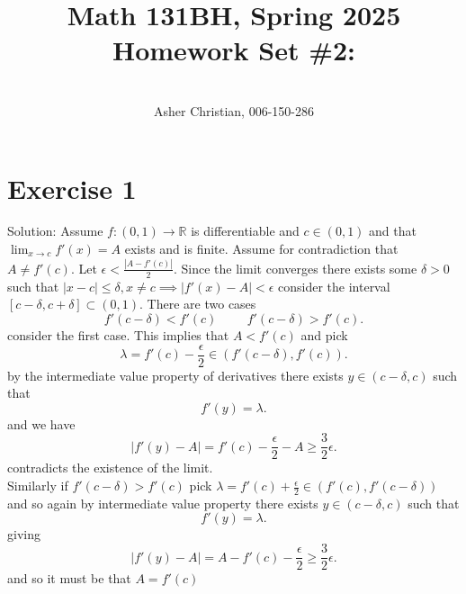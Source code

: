 \documentclass[11pt]{article}
\newcommand{\cnum}{Math 131BH}
\newcommand{\ced}{Spring 2025}
\newcommand{\ctitle}[4]{\title{\vspace{-0.5in}\cnum, \ced\\Homework Set #1: #2}\author{\vspace{-0.35in}\\#3, #4}}
\newcommand{\solution}[1]{{{\textcolor{header}{Solution:} \textcolor{solution}{#1}}}}
\begin{document}
\ctitle{\#2}{}{Asher Christian}{006-150-286}
\date{}
\maketitle
\section{Exercise 1}
\solution{
    Assume $f: (0,1) \rightarrow \mathbb{R}$ is differentiable and $c \in (0,1)$ and
    that $\lim_{x\to  c}f'(x) = A$ exists and is finite.
    Assume for contradiction that $A \ne f'(c)$.
    Let $\epsilon < \frac{|A - f'(c)|}{2}$. Since the limit converges
    there exists some $\delta > 0$ such that $|x-c| \le \delta, x \ne c \implies |f'(x)-A| < \epsilon$
    consider the interval $[c-\delta,c+\delta] \subset (0,1)$.
    There are two cases
    \[
        f'(c-\delta) < f'(c) \hspace{1cm} f'(c- \delta) > f'(c)
    .\] 
    consider the first case. This implies that $A < f'(c)$ and pick
     \[
    \lambda = f'(c) - \frac{\epsilon}{2} \in (f'(c - \delta), f'(c))
    .\] 
    by the intermediate value property of derivatives there exists $y \in (c-\delta, c)$ such that
    \[
    f'(y) = \lambda
    .\]
    and we have
    \[
    |f'(y) - A| = f'(c) - \frac{\epsilon}{2} - A \ge \frac{3}{2}\epsilon
    .\] 
    contradicts the existence of the limit.\\
    Similarly if $f'(c-\delta) > f'(c)$ pick $ \lambda = f'(c) + \frac{\epsilon}{2} \in (f'(c), f'(c-\delta))$
    and so again by intermediate value property there exists $y \in (c-\delta, c)$ such that
    \[
    f'(y) = \lambda
    .\] 
    giving
    \[
    |f'(y) - A| = A - f'(c) - \frac{\epsilon}{2} \ge \frac{3}{2}\epsilon
    .\] 
    and so it must be that $A = f'(c)$
}
\end{document}
